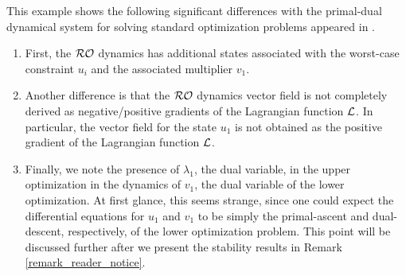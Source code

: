 \documentclass[journal,twoside,web]{ieeecolor}
\begin{document}
This example shows the following significant differences with the primal-dual dynamical system for solving standard optimization problems appeared in \cite{feijer2010,cherukuri2016}.
\begin{enumerate}
\item First, the ${\cal RO}$ dynamics has additional states associated with the worst-case constraint $u_i$ and the associated multiplier $v_1$.
 \item Another difference is that the ${\cal RO}$ dynamics vector field is not completely derived as negative/positive gradients of the Lagrangian function ${\cal L}$. In particular, the vector field for the state $u_1$ is not obtained as the positive gradient of the Lagrangian function ${\cal L}$.
\item Finally, we note the presence of $\lambda_1$, the dual variable, in the upper optimization in the dynamics of $v_1$, the dual variable of the lower optimization. At first glance, this seems strange, since one could expect the differential equations for $u_1$ and $v_1$ to be simply the primal-ascent and dual-descent, respectively, of the lower optimization problem. This point will be discussed further after we present the stability results in Remark \ref{remark_reader_notice}.
\end{enumerate}
\end{document}
